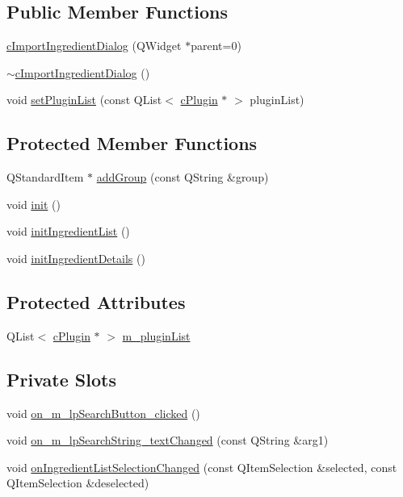 \subsection*{Public Member Functions}
\begin{DoxyCompactItemize}
\item 
\hyperlink{classc_import_ingredient_dialog_a4bea50afa976e55633017756cef4443e}{c\+Import\+Ingredient\+Dialog} (Q\+Widget $\ast$parent=0)
\item 
\hyperlink{classc_import_ingredient_dialog_a07b1bee5504a45413b3736d757bf2c5e}{$\sim$c\+Import\+Ingredient\+Dialog} ()
\item 
void \hyperlink{classc_import_ingredient_dialog_ad710be68582d34c43a399b4764c0434a}{set\+Plugin\+List} (const Q\+List$<$ \hyperlink{classc_plugin}{c\+Plugin} $\ast$ $>$ plugin\+List)
\end{DoxyCompactItemize}
\subsection*{Protected Member Functions}
\begin{DoxyCompactItemize}
\item 
Q\+Standard\+Item $\ast$ \hyperlink{classc_import_ingredient_dialog_ae0115db7ba009ecbfcd0af68f4e71e3d}{add\+Group} (const Q\+String \&group)
\item 
void \hyperlink{classc_import_ingredient_dialog_acd246954f20eba6d65d233adb3a9c293}{init} ()
\item 
void \hyperlink{classc_import_ingredient_dialog_adf78505fef0d070021878b885fd5a0ea}{init\+Ingredient\+List} ()
\item 
void \hyperlink{classc_import_ingredient_dialog_a6158a639b7b11973e84ddb3ca7d9aeb6}{init\+Ingredient\+Details} ()
\end{DoxyCompactItemize}
\subsection*{Protected Attributes}
\begin{DoxyCompactItemize}
\item 
Q\+List$<$ \hyperlink{classc_plugin}{c\+Plugin} $\ast$ $>$ \hyperlink{classc_import_ingredient_dialog_ad5795b238430db474ae852bfbb493578}{m\+\_\+plugin\+List}
\end{DoxyCompactItemize}
\subsection*{Private Slots}
\begin{DoxyCompactItemize}
\item 
void \hyperlink{classc_import_ingredient_dialog_aad6f67e1420e7ceba52d6ea72bf70e88}{on\+\_\+m\+\_\+lp\+Search\+Button\+\_\+clicked} ()
\item 
void \hyperlink{classc_import_ingredient_dialog_a2b5fa289051ab3b18e71f7e2cb7573b3}{on\+\_\+m\+\_\+lp\+Search\+String\+\_\+text\+Changed} (const Q\+String \&arg1)
\item 
void \hyperlink{classc_import_ingredient_dialog_a7aaca4be76facdc5c90fd321825a6289}{on\+Ingredient\+List\+Selection\+Changed} (const Q\+Item\+Selection \&selected, const Q\+Item\+Selection \&deselected)
\end{DoxyCompactItemize}
